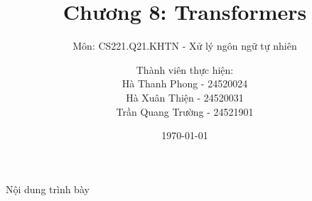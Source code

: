 \documentclass[10pt]{beamer}
\title[Transformers]{Chương 8: Transformers}
\subtitle{Môn: CS221.Q21.KHTN - Xử lý ngôn ngữ tự nhiên}
\author[University of Information Technology]{Thành viên thực hiện: \\ Hà Thanh Phong - 24520024 \\ Hà Xuân Thiện - 24520031 \\ Trần Quang Trường - 24521901}
\institute[UIT]{Trường Đại học Công nghệ Thông tin (UIT)}
\date{\today}
\begin{document}
	\begin{frame}
	    \titlepage
	\end{frame}
	

	\begin{frame}{Nội dung trình bày}
	    \tableofcontents
	\end{frame}

	
	
	
	
	
	
\end{document}
